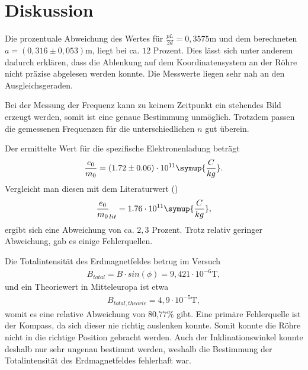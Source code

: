 \section{Diskussion}
\label{sec:Diskussion}

Die prozentuale Abweichung des Wertes für $\frac{pL}{2d} = 0,3575 \si{\meter} $ und dem berechneten $a = (0,316 \pm 0,053)  \si{\meter}$, liegt bei ca. $12$ Prozent.
Dies lässt sich unter anderem dadurch erklären, dass die Ablenkung auf dem Koordinatensystem an der Röhre nicht präzise abgelesen werden konnte.
Die Messwerte liegen sehr nah an den Ausgleichsgeraden.

\noindent Bei der Messung der Frequenz kann zu keinem Zeitpunkt ein stehendes Bild erzeugt werden, somit ist eine genaue Bestimmung unmöglich. 
Trotzdem passen die gemessenen Frequenzen für die unterschiedlichen $n$ gut überein.

\noindent 
Der ermittelte Wert für die spezifische Elektronenladung beträgt 
\begin{align*}
\frac{e_0}{m_0} = (1.72 \pm 0.06) \cdot 10^{11} \symup{\frac{C}{kg}} .
\end{align*}
Vergleicht man diesen mit dem Literaturwert (\cite{kent3})
\begin{align*}
\frac{e_0}{m_0}_{lit} = 1.76 \cdot 10^{11} \symup{\frac{C}{kg}},
\end{align*}
ergibt sich eine Abweichung von ca. $2,3$ Prozent. Trotz relativ geringer Abweichung, gab es einige Fehlerquellen.

Die Totalintensität des Erdmagnetfeldes betrug im Versuch 
\begin{align*}
B_{total} = B \cdot sin(\phi) = 9,421 \cdot 10^{-6} \si{\tesla},
\end{align*}
und ein Theoriewert in Mitteleuropa\cite{kent4} ist etwa
\begin{align*}
B_{total,theorie} =  4,9 \cdot 10^{-5} \si{\tesla},
\end{align*}
womit es eine relative Abweichung von 80,77\% gibt.
Eine primäre Fehlerquelle ist der Kompass, da sich dieser nie richtig auslenken konnte.
Somit konnte die Röhre nicht in die richtige Position gebracht werden. 
Auch der Inklinationswinkel konnte deshalb nur sehr ungenau bestimmt werden, weshalb die Bestimmung der Totalintensität des Erdmagnetfeldes fehlerhaft war.